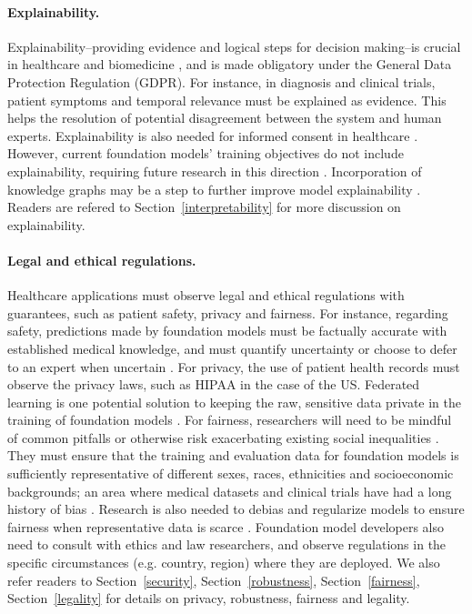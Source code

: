 \paragraph{Explainability.}
Explainability--providing evidence and logical steps for decision making--is crucial in healthcare and biomedicine \citep{holzinger2019causability}, and is made obligatory under the General Data Protection Regulation (GDPR). For instance, in diagnosis and clinical trials, patient symptoms and temporal relevance must be explained as evidence. This helps the resolution of potential disagreement between the system and human experts. Explainability is also needed for informed consent in healthcare \citep{amann2020explainability}. However, current foundation models' training objectives do not include explainability, requiring future research in this direction \citep{linardatos2021explainable}. Incorporation of knowledge graphs may be a step to further improve model explainability \citep{roberts2020much, xu2020building, jin2021biomedical}. Readers are refered to Section~\ref{interpretability} for more discussion on explainability.

\paragraph{Legal and ethical regulations.} Healthcare applications must observe legal and ethical regulations with guarantees, such as patient safety, privacy and fairness. For instance, regarding safety, predictions made by foundation models must be factually accurate with established medical knowledge, and must quantify uncertainty or choose to defer to an expert when uncertain \citep{challen2019artificial,mozannar2020consistent}. For privacy, the use of patient health records must observe the privacy laws, such as HIPAA \citep{act1996health} in the case of the US. Federated learning is one potential solution to keeping the raw, sensitive data private in the training of foundation models \citep{chamikara2021privacy}. For fairness, researchers will need to be mindful of common pitfalls or otherwise risk exacerbating existing social inequalities \cite{ chen2019can, wiens2019no, chen2020treating}. They must ensure that the training and evaluation data for foundation models is sufficiently representative of different sexes, races, ethnicities and socioeconomic backgrounds; an area where medical datasets and clinical trials have had a long history of bias \citep{martinez2020ethical,kaushal2020geographic}. Research is also needed to debias and regularize models to ensure fairness when representative data is scarce \cite{zhao2020training}. Foundation model developers also need to consult with ethics and law researchers, and observe regulations in the specific circumstances (e.g. country, region) where they are deployed. We also refer readers to Section~\ref{security}, Section~\ref{robustness}, Section~\ref{fairness}, Section~\ref{legality} for details on privacy, robustness, fairness and legality. 

